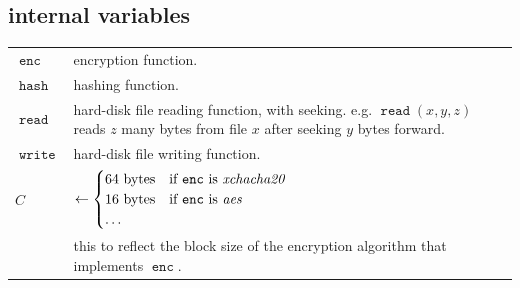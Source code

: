 \documentclass[twocolumn]{article}
\DeclareMathOperator{\fread}{\mathtt{read}}
\DeclareMathOperator{\fwrite}{\mathtt{write}}
\DeclareMathOperator{\enc}{\mathtt{enc}}
\DeclareMathOperator{\hash}{\mathtt{hash}}
\begin{document}
\subsection{internal variables}
\begin{tabularx}{\columnwidth}{lX}
    $\enc$      & encryption function.\\
    $\hash$     & hashing function.\\
    $\fread$    & hard-disk file reading function, with seeking.  e.g.
                    $\fread(x, y, z)$ reads $z$ many bytes from file $x$
                    after seeking $y$ bytes forward.\\
    $\fwrite$   & hard-disk file writing function.\\
    $C$         & $\gets \begin{cases}
                        64 \text{ bytes} & \text{if $\enc$ is
                                            \emph{xchacha20}}\\
                        16 \text{ bytes} & \text{if $\enc$ is \emph{aes}}\\
                        \ldots & \\
                     \end{cases}$\\
                & this to reflect the block size of the encryption
                    algorithm that implements $\enc$.\\
\end{tabularx}
\end{document}
